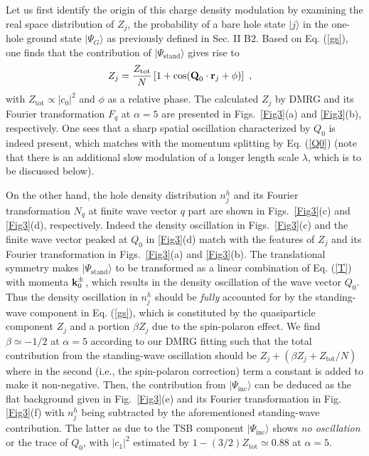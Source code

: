 \documentclass[aps,prb,twocolumn,notitlepage,superscriptaddress,showpacs]{revtex4-1}
\begin{document}
Let us first identify the origin of this charge density modulation by examining the real space distribution of $Z_j$, the probability of a bare hole state $|j\rangle$ in the one-hole ground state $|\Psi_G \rangle$ as previously defined in Sec. II B2. Based on Eq. (\ref{gs}), one finds that the contribution of $|\Psi_{\mathrm {stand}}\rangle $ gives rise to
\begin{align}\label{zj}
Z_j &=\frac{Z_{\text{tot}}}{N}\left[1+ \cos({\textbf Q}_0\cdot {\bf r}_j+\phi)\right]  ~,
\end{align}
with $Z_{\text{tot}}\propto |c_0|^2$ and $\phi$ as a relative phase. The calculated $Z_j$ by DMRG and its Fourier transformation $F_q$ at $\alpha=5$ are presented in Figs.~\ref{Fig3}(a) and \ref{Fig3}(b), respectively. One sees that a sharp spatial oscillation characterized by $Q_0$ is indeed present, which matches with the momentum splitting by Eq. (\ref{Q0}) (note that there is an additional slow modulation of a longer length scale $\lambda$, which is to be discussed below).

On the other hand, the hole density distribution $n_j^h$ and its Fourier transformation $N_q$ at finite wave vector $q$ part are shown in Figs.~\ref{Fig3}(c) and \ref{Fig3}(d), respectively.  Indeed the density oscillation in Figs.~\ref{Fig3}(c) and the finite wave vector peaked at $Q_0$ in \ref{Fig3}(d) match with the features of $Z_j$ and its Fourier transformation in Figs.~\ref{Fig3}(a) and \ref{Fig3}(b). The translational symmetry makes $|\Psi_{\mathrm {stand}}\rangle $ to be transformed as a linear combination of Eq. (\ref{T}) with momenta ${\textbf k}^{\pm}_0$, which results in the density oscillation of the wave vector $Q_0$.  Thus the density oscillation in $n_j^h$ should be \emph{fully} accounted for by the standing-wave component in Eq. (\ref{gs}), which is constituted by the quasiparticle component $Z_j$ and a portion $\beta Z_j$ due to the spin-polaron effect. We find $\beta\simeq -1/2$ at $\alpha=5$ according to our DMRG fitting such that the total contribution from the standing-wave oscillation should be $Z_j+(\beta Z_j+ Z_{\text{tot}}/N)$ where in the second (i.e., the spin-polaron correction) term a constant is added to make it non-negative. Then, the contribution from $|\Psi_{\mathrm {inc}}\rangle $ can be deduced as the flat background given in Fig.~\ref{Fig3}(e) and its Fourier transformation in Fig. \ref{Fig3}(f) with $n_j^h$ being subtracted by the aforementioned standing-wave contribution. The latter as due to the TSB component $|\Psi_{\mathrm {inc}}\rangle $ shows \emph{no oscillation} or the trace of $Q_0$, with $|c_1|^2$ estimated by $1-(3/2)Z_{\text{tot}}\simeq 0.88$ at $\alpha=5$.
\end{document}
